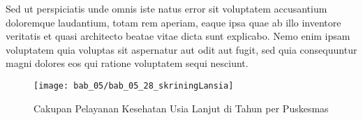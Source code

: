 Sed ut perspiciatis unde omnis iste natus error sit voluptatem accusantium doloremque laudantium, totam rem aperiam, eaque ipsa quae ab illo inventore veritatis et quasi architecto beatae vitae dicta sunt explicabo. Nemo enim ipsam voluptatem quia voluptas sit aspernatur aut odit aut fugit, sed quia consequuntur magni dolores eos qui ratione voluptatem sequi nesciunt.

\begin{figure}[H]
    \centering
    \texttt{[image: bab\_05/bab\_05\_28\_skriningLansia]}
    \caption{Cakupan Pelayanan Kesehatan Usia Lanjut di \namaKabupaten Tahun \tP per Puskesmas}
    \label{fig:Cakupan-Yankes-Usila}
\end{figure}
